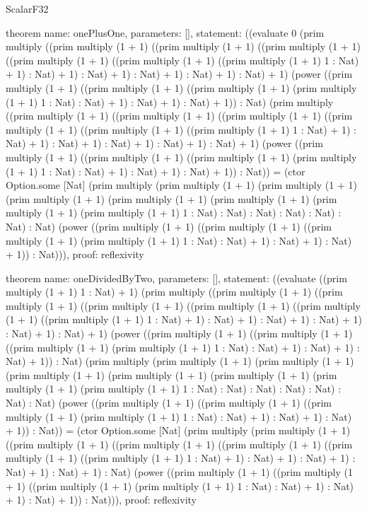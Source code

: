 \begin{lexlean}{ScalarF32}
\begin{semanticmodule}
theorem{
  name: onePlusOne,
  parameters: [],
  statement: ((evaluate 0 (prim multiply ((prim multiply (1 + 1) ((prim multiply (1 + 1) ((prim multiply (1 + 1) ((prim multiply (1 + 1) ((prim multiply (1 + 1) ((prim multiply (1 + 1) 1 : Nat) + 1) : Nat) + 1) : Nat) + 1) : Nat) + 1) : Nat) + 1) : Nat) + 1) (power ((prim multiply (1 + 1) ((prim multiply (1 + 1) ((prim multiply (1 + 1) (prim multiply (1 + 1) 1 : Nat) : Nat) + 1) : Nat) + 1) : Nat) + 1)) : Nat) (prim multiply ((prim multiply (1 + 1) ((prim multiply (1 + 1) ((prim multiply (1 + 1) ((prim multiply (1 + 1) ((prim multiply (1 + 1) ((prim multiply (1 + 1) 1 : Nat) + 1) : Nat) + 1) : Nat) + 1) : Nat) + 1) : Nat) + 1) : Nat) + 1) (power ((prim multiply (1 + 1) ((prim multiply (1 + 1) ((prim multiply (1 + 1) (prim multiply (1 + 1) 1 : Nat) : Nat) + 1) : Nat) + 1) : Nat) + 1)) : Nat)) = (ctor Option.some [Nat] (prim multiply (prim multiply (1 + 1) (prim multiply (1 + 1) (prim multiply (1 + 1) (prim multiply (1 + 1) (prim multiply (1 + 1) (prim multiply (1 + 1) (prim multiply (1 + 1) 1 : Nat) : Nat) : Nat) : Nat) : Nat) : Nat) : Nat) (power ((prim multiply (1 + 1) ((prim multiply (1 + 1) ((prim multiply (1 + 1) (prim multiply (1 + 1) 1 : Nat) : Nat) + 1) : Nat) + 1) : Nat) + 1)) : Nat))),
  proof: reflexivity{}
}

theorem{
  name: oneDividedByTwo,
  parameters: [],
  statement: ((evaluate ((prim multiply (1 + 1) 1 : Nat) + 1) (prim multiply ((prim multiply (1 + 1) ((prim multiply (1 + 1) ((prim multiply (1 + 1) ((prim multiply (1 + 1) ((prim multiply (1 + 1) ((prim multiply (1 + 1) 1 : Nat) + 1) : Nat) + 1) : Nat) + 1) : Nat) + 1) : Nat) + 1) : Nat) + 1) (power ((prim multiply (1 + 1) ((prim multiply (1 + 1) ((prim multiply (1 + 1) (prim multiply (1 + 1) 1 : Nat) : Nat) + 1) : Nat) + 1) : Nat) + 1)) : Nat) (prim multiply (prim multiply (1 + 1) (prim multiply (1 + 1) (prim multiply (1 + 1) (prim multiply (1 + 1) (prim multiply (1 + 1) (prim multiply (1 + 1) (prim multiply (1 + 1) 1 : Nat) : Nat) : Nat) : Nat) : Nat) : Nat) : Nat) (power ((prim multiply (1 + 1) ((prim multiply (1 + 1) ((prim multiply (1 + 1) (prim multiply (1 + 1) 1 : Nat) : Nat) + 1) : Nat) + 1) : Nat) + 1)) : Nat)) = (ctor Option.some [Nat] (prim multiply (prim multiply (1 + 1) ((prim multiply (1 + 1) ((prim multiply (1 + 1) ((prim multiply (1 + 1) ((prim multiply (1 + 1) ((prim multiply (1 + 1) 1 : Nat) + 1) : Nat) + 1) : Nat) + 1) : Nat) + 1) : Nat) + 1) : Nat) (power ((prim multiply (1 + 1) ((prim multiply (1 + 1) ((prim multiply (1 + 1) (prim multiply (1 + 1) 1 : Nat) : Nat) + 1) : Nat) + 1) : Nat) + 1)) : Nat))),
  proof: reflexivity{}
}


\end{semanticmodule}
\end{lexlean}
